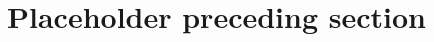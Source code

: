 \documentclass[10pt,twocolumn]{article}
\begin{document}
\section{Placeholder preceding section}
\label{sec:real-context}

\end{document}

